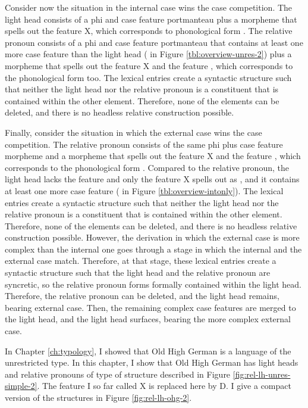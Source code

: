 Consider now the situation in the internal case wins the case competition. The light head consists of a phi and case feature portmanteau plus a morpheme that spells out the feature X, which corresponds to phonological form . The relative pronoun consists of a phi and case feature portmanteau that contains at least one more case feature than the light head ( in Figure \ref{tbl:overview-unres-2}) plus a morpheme that spells out the feature X and the feature , which corresponds to the phonological form  too.
The lexical entries create a syntactic structure such that neither the light head nor the relative pronoun is a constituent that is contained within the other element. Therefore, none of the elements can be deleted, and there is no headless relative construction possible.

Finally, consider the situation in which the external case wins the case competition. The relative pronoun consists of the same phi plus case feature morpheme and a morpheme that spells out the feature X and the feature , which corresponds to the phonological form . Compared to the relative pronoun, the light head lacks the feature  and only the feature X spells out as , and it contains at least one more case feature ( in Figure \ref{tbl:overview-intonly}). The lexical entries create a syntactic structure such that neither the light head nor the relative pronoun is a constituent that is contained within the other element. Therefore, none of the elements can be deleted, and there is no headless relative construction possible.
However, the derivation in which the external case is more complex than the internal one goes through a stage in which the internal and the external case match. Therefore, at that stage, these lexical entries create a syntactic structure such that the light head and the relative pronoun are syncretic, so the relative pronoun forms formally contained within the light head. Therefore, the relative pronoun can be deleted, and the light head remains, bearing external case. Then, the remaining complex case features are merged to the light head, and the light head surfaces, bearing the more complex external case.

In Chapter \ref{ch:typology}, I showed that Old High German is a language of the unrestricted type. In this chapter, I show that Old High German has light heads and relative pronouns of type of structure described in Figure \ref{fig:rel-lh-unres-simple-2}. The feature I so far called X is replaced here by D. I give a compact version of the structures in Figure \ref{fig:rel-lh-ohg-2}.

